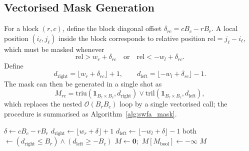 \subsection{Vectorised Mask Generation}\label{sec:swfa_mask}
For a block $(r, c)$, define the block diagonal offset
$\delta_{rc} = c B_c - r B_r$. A local position $(i_\ell, j_\ell)$
inside the block corresponds to relative position
$\mathrm{rel} = j_\ell - i_\ell$, which must be masked whenever
\begin{equation}
    \mathrm{rel} > w_r + \delta_{rc}
    \quad\text{or}\quad
    \mathrm{rel} < -w_l + \delta_{rc}.
\end{equation}
Define
\begin{equation}
    d_{\text{right}} = \lfloor w_r + \delta_{rc} \rfloor + 1, \qquad
    d_{\text{left}}  = \lfloor -w_l + \delta_{rc} \rfloor - 1.
\end{equation}
The mask can then be generated in a single shot as
\begin{equation}\label{eq:mask}
    M_{rc} =
    \mathrm{triu}(\mathbf{1}_{B_r \times B_c}, d_{\text{right}})
    \vee
    \mathrm{tril}(\mathbf{1}_{B_r \times B_c}, d_{\text{left}}),
\end{equation}
which replaces the nested $\mathcal{O}(B_r B_c)$ loop by a single
vectorised call; the procedure is summarised as
Algorithm~\ref{alg:swfa_mask}.

\begin{algorithm}[h]
    \caption{Efficient mask generation for an intersecting block.}
    \label{alg:swfa_mask}
    $\delta \leftarrow c B_c - r B_r$\;
    $d_{\text{right}} \leftarrow \lfloor w_r + \delta \rfloor + 1$\;
    $d_{\text{left}}  \leftarrow \lfloor -w_l + \delta \rfloor - 1$\;
    both $\leftarrow (d_{\text{right}} \le B_r) \wedge
                      (d_{\text{left}} \ge -B_c)$\;
    $M \leftarrow \mathbf{0}$;\ $M[M_{\text{bool}}] \leftarrow -\infty$\;
    \Return $M$\;
\end{algorithm}

